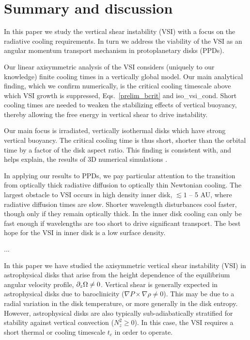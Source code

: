 \section{Summary and discussion}\label{summary}
In this paper we study the vertical shear instability (VSI) with a focus on 
the radiative cooling requirements.  In turn we address the viability of the VSI 
as an angular momentum transport mechanism in protoplanetary disks (PPDs).

Our linear axisymmetric analysis of the VSI 
considers (uniquely to our knowledge) finite cooling times in a vertically global model.  
Our main analytical finding, which we confirm numerically, is the critical cooling 
timescale above which VSI growth is suppressed, Eqs.\ \ref{prelim_bcrit} and {iso_vsi_cond}.
Short cooling times are needed to weaken the stabilizing effects of vertical buoyancy, thereby allowing 
the free energy in vertical shear to drive instability.

Our main focus is irradiated, vertically isothermal disks which have strong vertical buoyancy.
The critical cooling time is thus short, shorter than the orbital time by a factor of the disk
aspect ratio.  This finding is consistent with, and helps explain, the results of 3D numerical simulations .

In applying our results to PPDs, we pay particular attention to the transition from 
optically thick radiative diffusion to optically thin Newtonian cooling.  The largest obstacle to VSI occurs in 
high density inner disk, $\lesssim 1$ -- 5 AU, where radiative diffusion times are slow.  Shorter wavelength disturbances
 cool faster, though only if they remain optically thick.  In the inner disk cooling can only be fast enough
 if wavelengths are too short to drive significant transport.  The best hope for the VSI in inner disk is a low surface density.

...

In this paper we have studied the axisymmetric vertical shear 
instability (VSI) in astrophysical disks that arise from the 
height dependence of the equilibrium angular velocity profile,  
$\partial_z\Omega\neq 0$. Vertical shear is generally
expected in astrophysical disks due to baroclinicity ($\nabla
P\times\nabla \rho \neq 0$). This may be due
to a radial variation in the disk temperature, or more generally in
the disk entropy. However, astrophysical disks are also typically
sub-adiabatically stratified for stability against vertical
convection ($N_z^2\geq 0$). In this case, the VSI requires a short
thermal or cooling timescale $t_c$ in order to operate.  

